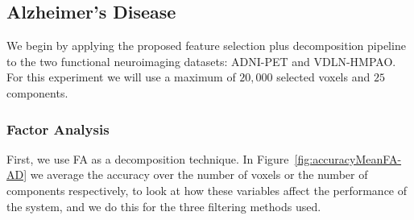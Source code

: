 \subsection{Alzheimer's Disease}
We begin by applying the proposed feature selection plus decomposition pipeline to the two functional neuroimaging datasets: ADNI-PET and VDLN-HMPAO. For this experiment we will use a maximum of $20,000$ selected voxels and $25$ components. 

\subsubsection{Factor Analysis}\label{sec:results_FA_AD}
First, we use \ac{FA} as a decomposition technique. In Figure~\ref{fig:accuracyMeanFA-AD} we average the accuracy over the number of voxels or the number of components respectively, to look at how these variables affect the performance of the system, and we do this for the three filtering methods used. 

